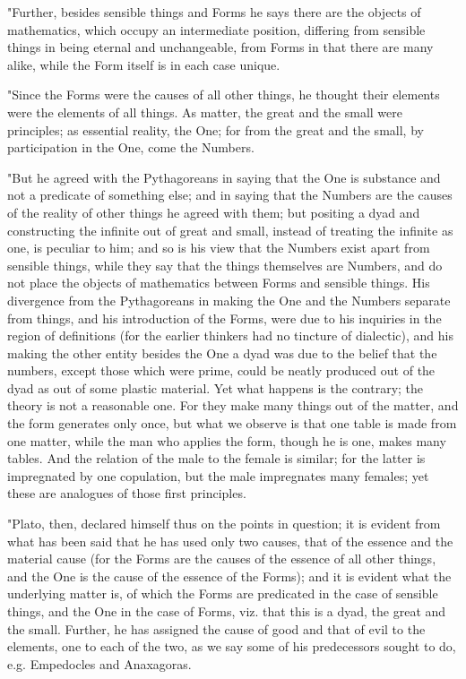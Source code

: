 "Further, besides sensible things and Forms he says there are the
objects of mathematics, which occupy an intermediate position, differing
from sensible things in being eternal and unchangeable, from Forms
in that there are many alike, while the Form itself is in each case
unique. 

"Since the Forms were the causes of all other things, he thought their
elements were the elements of all things. As matter, the great and
the small were principles; as essential reality, the One; for from
the great and the small, by participation in the One, come the Numbers.

"But he agreed with the Pythagoreans in saying that the One is substance
and not a predicate of something else; and in saying that the Numbers
are the causes of the reality of other things he agreed with them;
but positing a dyad and constructing the infinite out of great and
small, instead of treating the infinite as one, is peculiar to him;
and so is his view that the Numbers exist apart from sensible things,
while they say that the things themselves are Numbers, and do not
place the objects of mathematics between Forms and sensible things.
His divergence from the Pythagoreans in making the One and the Numbers
separate from things, and his introduction of the Forms, were due
to his inquiries in the region of definitions (for the earlier thinkers
had no tincture of dialectic), and his making the other entity besides
the One a dyad was due to the belief that the numbers, except those
which were prime, could be neatly produced out of the dyad as out
of some plastic material. Yet what happens is the contrary; the theory
is not a reasonable one. For they make many things out of the matter,
and the form generates only once, but what we observe is that one
table is made from one matter, while the man who applies the form,
though he is one, makes many tables. And the relation of the male
to the female is similar; for the latter is impregnated by one copulation,
but the male impregnates many females; yet these are analogues of
those first principles. 

"Plato, then, declared himself thus on the points in question; it
is evident from what has been said that he has used only two causes,
that of the essence and the material cause (for the Forms are the
causes of the essence of all other things, and the One is the cause
of the essence of the Forms); and it is evident what the underlying
matter is, of which the Forms are predicated in the case of sensible
things, and the One in the case of Forms, viz. that this is a dyad,
the great and the small. Further, he has assigned the cause of good
and that of evil to the elements, one to each of the two, as we say
some of his predecessors sought to do, e.g. Empedocles and Anaxagoras.

